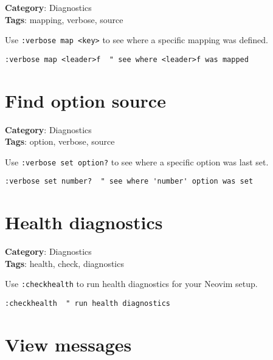{{{{\textbf{Category}: Diagnostics\\ \textbf{Tags}: mapping, verbose, source
\vspace{0.5cm}

Use {\footnotesize \Verb§:verbose map <key>§} to see where a specific mapping was defined.

\begin{Exa*}{}
\begin{Verbatim}[fontsize=\footnotesize, breaklines, breakanywhere]
:verbose map <leader>f  " see where <leader>f was mapped
\end{Verbatim}
\end{Exa*}

\section{Find option source}

\textbf{Category}: Diagnostics\\ \textbf{Tags}: option, verbose, source
\vspace{0.5cm}

Use {\footnotesize \Verb§:verbose set option?§} to see where a specific option was last set.

\begin{Exa*}{}
\begin{Verbatim}[fontsize=\footnotesize, breaklines, breakanywhere]
:verbose set number?  " see where 'number' option was set
\end{Verbatim}
\end{Exa*}

\section{Health diagnostics}

\textbf{Category}: Diagnostics\\ \textbf{Tags}: health, check, diagnostics
\vspace{0.5cm}

Use {\footnotesize \Verb§:checkhealth§} to run health diagnostics for your Neovim setup.

\begin{Exa*}{}
\begin{Verbatim}[fontsize=\footnotesize, breaklines, breakanywhere]
:checkhealth  " run health diagnostics
\end{Verbatim}
\end{Exa*}

\section{View messages}

}}}}
